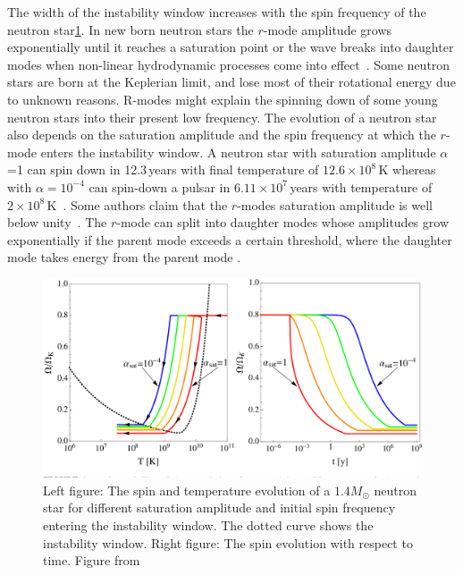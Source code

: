 \documentclass{ttuthes2007}
\begin{document}
The width of the instability window increases with the spin
frequency of the neutron star\ref{fig:instability}. In new born neutron stars
the
$r$-mode amplitude grows exponentially until it reaches a saturation point or
the wave breaks into daughter modes when non-linear hydrodynamic processes
come into effect~\cite{Owen_1998}. Some neutron stars are born at the Keplerian
limit, and lose most of their rotational energy due to unknown reasons. R-modes might explain the spinning down of
some young
neutron stars into their present low frequency. The evolution of a neutron star
also depends on the saturation amplitude and the spin frequency at which the
$r$-mode enters the instability window. A neutron star with
saturation amplitude $\alpha$=1 can spin down in 12.3\,years with final
temperature of $12.6 \times 10^8\,\mathrm{K}$ whereas with $\alpha=10^{-4}$ can spin-down a
pulsar in $6.11 \times 10^7$\,years with temperature of $2 \times 10^8\,\mathrm{K}$~\cite{Alford_2014}. Some authors claim that the
$r$-modes saturation amplitude is well below unity~\cite{Gressman_2002}. The $r$-mode can split
into daughter modes whose amplitudes grow exponentially if the parent mode
exceeds a certain threshold, where the daughter mode takes energy from the parent mode
\cite{Arras_2003}.
\begin{figure}[bht!]                                                            
        \includegraphics[width=\textwidth]{figure/rmodesamplitude.png}                         
	\caption{Left figure: The spin and temperature  evolution of a $1.4 M_\odot$ neutron star
for different saturation amplitude and initial spin frequency entering the
instability window. The dotted curve shows the instability window. Right figure: The spin evolution with respect to time. Figure from ~\cite{Alford_2014}}
        \label{fig:instability}                                                     
\end{figure}  
\end{document}
